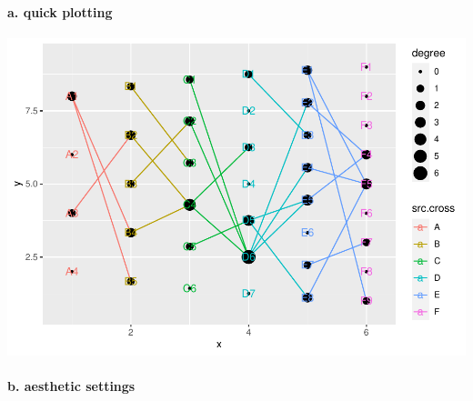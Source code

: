 \documentclass[
]{article}
\newenvironment{Shaded}{\begin{snugshade}}{\end{snugshade}}
\newcommand{\KeywordTok}[1]{\textcolor[rgb]{0.13,0.29,0.53}{\textbf{#1}}}
\newcommand{\NormalTok}[1]{#1}
\newcommand{\OperatorTok}[1]{\textcolor[rgb]{0.81,0.36,0.00}{\textbf{#1}}}
\newcommand{\StringTok}[1]{\textcolor[rgb]{0.31,0.60,0.02}{#1}}
\let\oldparagraph\paragraph
\renewcommand{\paragraph}[1]{\oldparagraph{#1}\mbox{}}
\begin{document}
\hypertarget{a.-quick-plotting}{%
\paragraph{a. quick plotting}\label{a.-quick-plotting}}

\begin{Shaded}
\end{Shaded}

\includegraphics{ReadMe_files/figure-latex/unnamed-chunk-7-1.pdf}

\hypertarget{b.-aesthetic-settings}{%
\paragraph{b. aesthetic settings}\label{b.-aesthetic-settings}}
\end{document}
